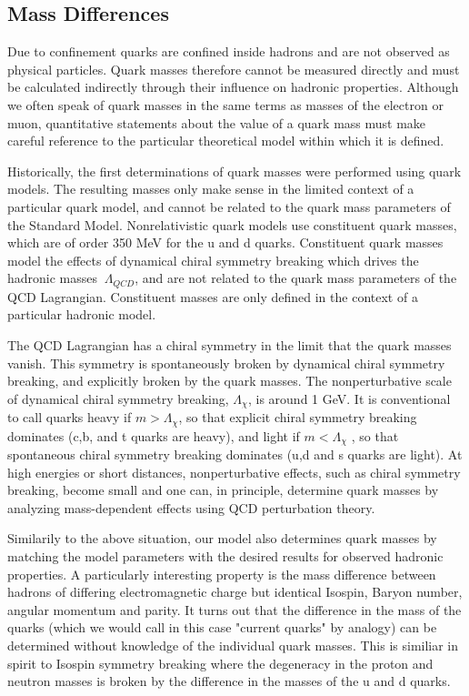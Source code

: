 \documentclass[11pt,a4paper]{article}
\begin{document}
 \subsection{Mass Differences}
 \label{sec:massdiff}

\cite{PDGmassdif} Due to confinement quarks are confined inside hadrons and are not observed as physical particles. Quark masses therefore cannot be measured directly and must be calculated indirectly through their influence on hadronic properties. Although we often speak of quark masses in the same terms as masses of the electron or muon, quantitative statements about the value of a quark mass must make careful reference to the particular theoretical model within which it is defined.

Historically, the first determinations of quark masses were performed using quark models. The resulting masses only make sense in the limited context of a particular quark model, and cannot be related to the quark mass parameters of the Standard Model. Nonrelativistic quark models use constituent quark masses, which are of order 350 MeV for the u and d quarks. Constituent quark masses model the effects of dynamical chiral symmetry breaking which drives the hadronic masses $~\Lambda_{QCD}$, and are not related to the quark mass parameters of the QCD Lagrangian. Constituent masses are only defined in the context of a particular hadronic model. 

The QCD Lagrangian has a chiral symmetry in the limit that the quark masses vanish. This symmetry is spontaneously broken by dynamical chiral symmetry breaking, and explicitly broken by the quark masses. The nonperturbative scale of dynamical chiral symmetry breaking, $\Lambda_{\chi}$, is around 1 GeV. It is conventional to call quarks heavy if $m>\Lambda_{\chi}$, so that explicit chiral symmetry breaking dominates (c,b, and t quarks are heavy), and light if $m<\Lambda_{\chi}$ , so that spontaneous chiral symmetry breaking dominates (u,d and s quarks are light). At high energies or short distances, nonperturbative effects, such as chiral symmetry breaking, become small and one can, in principle, determine quark masses by analyzing mass-dependent effects using QCD perturbation theory.

Similarily to the above situation, our model also determines quark masses by matching the model parameters with the desired results for observed hadronic properties. A particularly interesting property is the mass difference between hadrons of differing electromagnetic charge but identical Isospin, Baryon number, angular momentum and parity. It turns out that the difference in the mass of the quarks (which we would call in this case "current quarks" by analogy) can be determined without knowledge of the individual quark masses. This is similiar in spirit to Isospin symmetry breaking where the degeneracy in the proton and neutron masses is broken by the difference in the masses of the u and d quarks.
\end{document}
